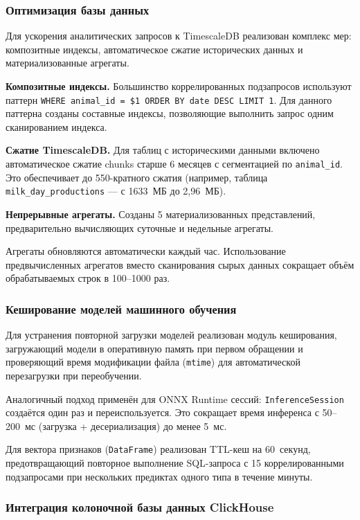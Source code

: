 \subsubsection{Оптимизация базы данных}

Для ускорения аналитических запросов к TimescaleDB реализован комплекс мер: композитные индексы, автоматическое сжатие исторических данных и материализованные агрегаты.

\textbf{Композитные индексы.} Большинство коррелированных подзапросов используют паттерн \texttt{WHERE animal\_id = \$1 ORDER BY date DESC LIMIT 1}. Для данного паттерна созданы составные индексы, позволяющие выполнить запрос одним сканированием индекса.

\textbf{Сжатие TimescaleDB.} Для таблиц с историческими данными включено автоматическое сжатие chunks старше 6 месяцев с сегментацией по \texttt{animal\_id}. Это обеспечивает до 550-кратного сжатия (например, таблица \texttt{milk\_day\_productions} --- с 1633~МБ до 2{,}96~МБ).

\textbf{Непрерывные агрегаты.} Созданы 5 материализованных представлений, предварительно вычисляющих суточные и недельные агрегаты.

Агрегаты обновляются автоматически каждый час. Использование предвычисленных агрегатов вместо сканирования сырых данных сокращает объём обрабатываемых строк в 100--1000 раз.

\subsubsection{Кеширование моделей машинного обучения}

Для устранения повторной загрузки моделей реализован модуль кеширования, загружающий модели в оперативную память при первом обращении и проверяющий время модификации файла (\texttt{mtime}) для автоматической перезагрузки при переобучении.

Аналогичный подход применён для ONNX Runtime сессий: \texttt{InferenceSession} создаётся один раз и переиспользуется. Это сокращает время инференса с 50--200~мс (загрузка + десериализация) до менее 5~мс.

Для вектора признаков (\texttt{DataFrame}) реализован TTL-кеш на 60~секунд, предотвращающий повторное выполнение SQL-запроса с 15 коррелированными подзапросами при нескольких предиктах одного типа в течение минуты.

\subsubsection{Интеграция колоночной базы данных ClickHouse}

